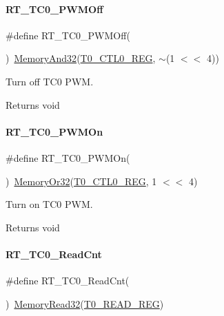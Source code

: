 \paragraph{\texorpdfstring{R\+T\+\_\+\+T\+C0\+\_\+\+P\+W\+M\+Off}{RT\_TC0\_PWMOff}}
{\footnotesize\ttfamily \#define R\+T\+\_\+\+T\+C0\+\_\+\+P\+W\+M\+Off(\begin{DoxyParamCaption}{ }\end{DoxyParamCaption})~\mbox{\hyperlink{a00068_ad87cedffcaadc51db22594fce55173d4}{Memory\+And32}}(\mbox{\hyperlink{a00068_ac94b0659ef32086a6752672082c0b3ed}{T0\+\_\+\+C\+T\+L0\+\_\+\+R\+EG}}, $\sim$(1 $<$$<$ 4))}



Turn off T\+C0 P\+WM. 

\begin{DoxyReturn}{Returns}
void 
\end{DoxyReturn}
\mbox{\label{a00137_a70e69675d0a4e7d5095f938dffa14779}} 
\paragraph{\texorpdfstring{R\+T\+\_\+\+T\+C0\+\_\+\+P\+W\+M\+On}{RT\_TC0\_PWMOn}}
{\footnotesize\ttfamily \#define R\+T\+\_\+\+T\+C0\+\_\+\+P\+W\+M\+On(\begin{DoxyParamCaption}{ }\end{DoxyParamCaption})~\mbox{\hyperlink{a00068_a27874a97deab7cecdde5ddecf466e31e}{Memory\+Or32}}(\mbox{\hyperlink{a00068_ac94b0659ef32086a6752672082c0b3ed}{T0\+\_\+\+C\+T\+L0\+\_\+\+R\+EG}}, 1 $<$$<$ 4)}



Turn on T\+C0 P\+WM. 

\begin{DoxyReturn}{Returns}
void 
\end{DoxyReturn}
\mbox{\label{a00137_acd97abf7aebb4ffa83af031604a67344}} 
\paragraph{\texorpdfstring{R\+T\+\_\+\+T\+C0\+\_\+\+Read\+Cnt}{RT\_TC0\_ReadCnt}}
{\footnotesize\ttfamily \#define R\+T\+\_\+\+T\+C0\+\_\+\+Read\+Cnt(\begin{DoxyParamCaption}{ }\end{DoxyParamCaption})~\mbox{\hyperlink{a00068_a2d484dc15bdf30ee11ab3b05f31f0e16}{Memory\+Read32}}(\mbox{\hyperlink{a00068_a277152b8a3150eb5ae1201205e2778fb}{T0\+\_\+\+R\+E\+A\+D\+\_\+\+R\+EG}})}



